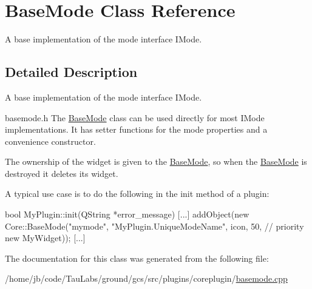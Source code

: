 \hypertarget{class_base_mode}{\section{\-Base\-Mode \-Class \-Reference}
\label{class_base_mode}
}


\-A base implementation of the mode interface \-I\-Mode.  




\subsection{\-Detailed \-Description}
\-A base implementation of the mode interface \-I\-Mode. 

basemode.\-h \-The \hyperlink{class_base_mode}{\-Base\-Mode} class can be used directly for most \-I\-Mode implementations. \-It has setter functions for the mode properties and a convenience constructor.

\-The ownership of the widget is given to the \hyperlink{class_base_mode}{\-Base\-Mode}, so when the \hyperlink{class_base_mode}{\-Base\-Mode} is destroyed it deletes its widget.

\-A typical use case is to do the following in the init method of a plugin\-: 
\begin{DoxyCode}
    bool MyPlugin::init(QString *error_message)
    {
        [...]
        addObject(new Core::BaseMode("mymode",
            "MyPlugin.UniqueModeName",
            icon,
            50, // priority
            new MyWidget));
        [...]
    }
\end{DoxyCode}
 

\-The documentation for this class was generated from the following file\-:\begin{DoxyCompactItemize}
\item 
/home/jb/code/\-Tau\-Labs/ground/gcs/src/plugins/coreplugin/\hyperlink{basemode_8cpp}{basemode.\-cpp}\end{DoxyCompactItemize}
